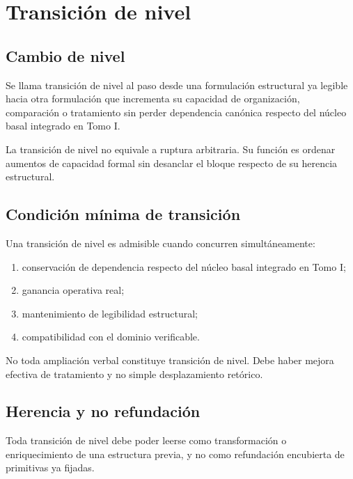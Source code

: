 \chapter{Transición de nivel}

\section{Cambio de nivel}
\begin{definition}
Se llama transición de nivel al paso desde una formulación estructural ya legible hacia otra formulación que incrementa su capacidad de organización, comparación o tratamiento sin perder dependencia canónica respecto del núcleo basal integrado en Tomo I.
\end{definition}

\begin{observation}
La transición de nivel no equivale a ruptura arbitraria. Su función es ordenar aumentos de capacidad formal sin desanclar el bloque respecto de su herencia estructural.
\end{observation}

\section{Condición mínima de transición}
\begin{definition}
Una transición de nivel es admisible cuando concurren simultáneamente:
\begin{enumerate}
  \item conservación de dependencia respecto del núcleo basal integrado en Tomo I;
  \item ganancia operativa real;
  \item mantenimiento de legibilidad estructural;
  \item compatibilidad con el dominio verificable.
\end{enumerate}
\end{definition}

\begin{observation}
No toda ampliación verbal constituye transición de nivel. Debe haber mejora efectiva de tratamiento y no simple desplazamiento retórico.
\end{observation}

\section{Herencia y no refundación}
\begin{definition}
Toda transición de nivel debe poder leerse como transformación o enriquecimiento de una estructura previa, y no como refundación encubierta de primitivas ya fijadas.
\end{definition}

